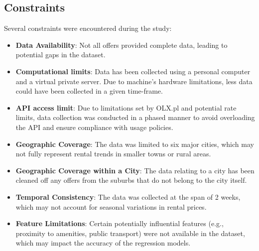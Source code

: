 \subsection{Constraints}
Several constraints were encountered during the study:
\begin{itemize}
\item \textbf{Data Availability}: Not all offers provided complete data, leading to potential gaps in the dataset.
\item \textbf{Computational limits}: Data has been collected using a personal computer and a virtual private server. Due to machine's hardware limitations, less data could have been collected in a given time-frame.
\item \textbf{API access limit}: Due to limitations set by OLX.pl and potential rate limits, data collection was conducted in a phased manner to avoid overloading the API and ensure compliance with usage policies.
\item \textbf{Geographic Coverage}: The data was limited to six major cities, which may not fully represent rental trends in smaller towns or rural areas.
\item \textbf{Geographic Coverage within a City}: The data relating to a city has been cleaned off any offers from the suburbs that do not belong to the city itself.
\item \textbf{Temporal Consistency}: The data was collected at the span of 2 weeks, which may not account for seasonal variations in rental prices.
\item \textbf{Feature Limitations}: Certain potentially influential features (e.g., proximity to amenities, public transport) were not available in the dataset, which may impact the accuracy of the regression models.
\end{itemize}